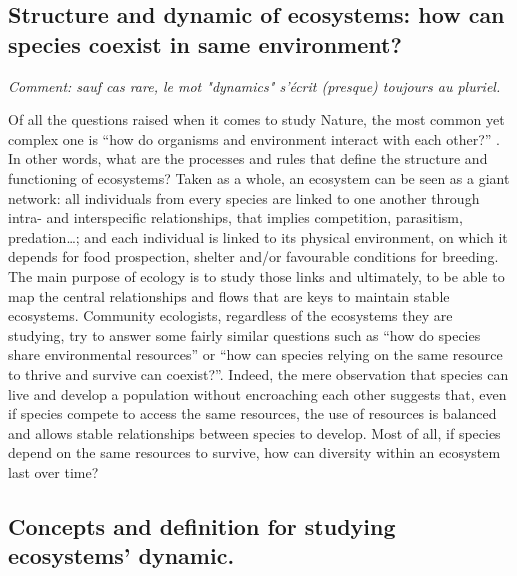 

\subsection{Structure and dynamic of ecosystems: how can species coexist in same environment?} 

\emph{Comment: sauf cas rare, le mot "dynamics" s'écrit (presque) toujours au pluriel.}

Of all the questions raised when it comes to study Nature, the most common yet complex one is ``how do organisms and environment interact with each other?'' \citep{sutherland2013}. In other words, what are the processes and rules that define the structure and functioning of ecosystems? Taken as a whole, an ecosystem can be seen as a giant network: all individuals from every species are linked to one another through intra- and interspecific relationships, that implies competition, parasitism, predation\ldots{}; and each individual is linked to its physical environment, on which it depends for food prospection, shelter and/or favourable conditions for breeding. The main purpose of ecology is to study those links and ultimately, to be able to map the central relationships and flows that are keys to maintain stable ecosystems. Community ecologists, regardless of the ecosystems they are studying, try to answer some fairly similar questions such as ``how do species share environmental resources'' or ``how can species relying on the same resource to thrive and survive can coexist?''. Indeed, the mere observation that species can live and develop a population without encroaching each other suggests that, even if species compete to access the same resources, the use of resources is balanced and allows stable relationships between species to develop. Most of all, if species depend on the same resources to survive, how can diversity within an ecosystem last over time?

\subsection{Concepts and definition for studying ecosystems’ dynamic.}
 
